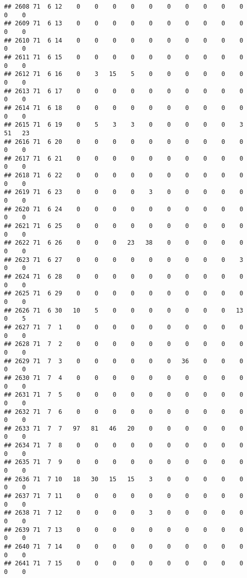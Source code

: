 \documentclass[]{article}
\begin{document}
\begin{verbatim}
## 2608 71  6 12    0    0    0    0    0    0    0    0    0    0    0    0
## 2609 71  6 13    0    0    0    0    0    0    0    0    0    0    0    0
## 2610 71  6 14    0    0    0    0    0    0    0    0    0    0    0    0
## 2611 71  6 15    0    0    0    0    0    0    0    0    0    0    0    0
## 2612 71  6 16    0    3   15    5    0    0    0    0    0    0    0    0
## 2613 71  6 17    0    0    0    0    0    0    0    0    0    0    0    0
## 2614 71  6 18    0    0    0    0    0    0    0    0    0    0    0    0
## 2615 71  6 19    0    5    3    3    0    0    0    0    0    3   51   23
## 2616 71  6 20    0    0    0    0    0    0    0    0    0    0    0    0
## 2617 71  6 21    0    0    0    0    0    0    0    0    0    0    0    0
## 2618 71  6 22    0    0    0    0    0    0    0    0    0    0    0    0
## 2619 71  6 23    0    0    0    0    3    0    0    0    0    0    0    0
## 2620 71  6 24    0    0    0    0    0    0    0    0    0    0    0    0
## 2621 71  6 25    0    0    0    0    0    0    0    0    0    0    0    0
## 2622 71  6 26    0    0    0   23   38    0    0    0    0    0    0    0
## 2623 71  6 27    0    0    0    0    0    0    0    0    0    3    0    0
## 2624 71  6 28    0    0    0    0    0    0    0    0    0    0    0    0
## 2625 71  6 29    0    0    0    0    0    0    0    0    0    0    0    0
## 2626 71  6 30   10    5    0    0    0    0    0    0    0   13    0    5
## 2627 71  7  1    0    0    0    0    0    0    0    0    0    0    0    0
## 2628 71  7  2    0    0    0    0    0    0    0    0    0    0    0    0
## 2629 71  7  3    0    0    0    0    0    0   36    0    0    0    0    0
## 2630 71  7  4    0    0    0    0    0    0    0    0    0    0    0    0
## 2631 71  7  5    0    0    0    0    0    0    0    0    0    0    0    0
## 2632 71  7  6    0    0    0    0    0    0    0    0    0    0    0    0
## 2633 71  7  7   97   81   46   20    0    0    0    0    0    0    0    0
## 2634 71  7  8    0    0    0    0    0    0    0    0    0    0    0    0
## 2635 71  7  9    0    0    0    0    0    0    0    0    0    0    0    0
## 2636 71  7 10   18   30   15   15    3    0    0    0    0    0    0    0
## 2637 71  7 11    0    0    0    0    0    0    0    0    0    0    0    0
## 2638 71  7 12    0    0    0    0    3    0    0    0    0    0    0    0
## 2639 71  7 13    0    0    0    0    0    0    0    0    0    0    0    0
## 2640 71  7 14    0    0    0    0    0    0    0    0    0    0    0    0
## 2641 71  7 15    0    0    0    0    0    0    0    0    0    0    0    0

\end{verbatim}
\end{document}
